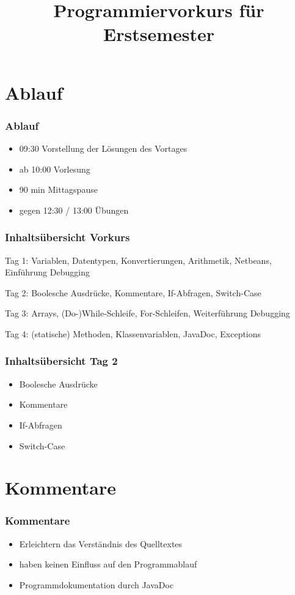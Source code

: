 \documentclass[final]{beamer}
\title{Programmiervorkurs für Erstsemester}
\begin{document}



\begin{frame}
  \titlepage
\end{frame}

\section{Ablauf}
\begin{frame}
  \frametitle{Ablauf}
  \begin{itemize}
    \item{09:30 Vorstellung der Lösungen des Vortages}
    \item{ab 10:00 Vorlesung}
    \item{90 min Mittagspause}
    \item{gegen 12:30 / 13:00 Übungen}
  \end{itemize}
\end{frame}

\begin{frame}
  \frametitle{Inhaltsübersicht Vorkurs}
  \begin{itemize}
  {\color{gray}
    \item {Tag 1: Variablen, Datentypen, Konvertierungen, Arithmetik, Netbeans, Einführung Debugging}
    {\color{black}
    \item {Tag 2: Boolesche Ausdrücke, Kommentare, If-Abfragen, Switch-Case}
    }
    \item {Tag 3: Arrays, (Do-)While-Schleife, For-Schleifen, Weiterführung Debugging}
    \item {Tag 4: (statische) Methoden, Klassenvariablen, JavaDoc, Exceptions}
  }
  \end{itemize}
\end{frame}

\begin{frame}
	\frametitle{Inhaltsübersicht Tag 2}
	\begin{itemize}
		\item {Boolesche Ausdrücke}
		\item {Kommentare}
		\item {If-Abfragen}
		\item {Switch-Case}
	\end{itemize}
\end{frame}

\section{Kommentare}
\begin{frame}
	\frametitle{Kommentare}
	\begin{itemize}
		\item{Erleichtern das Verständnis des Quelltextes}
		\item{haben keinen Einfluss auf den Programmablauf}
		\item{Programmdokumentation durch JavaDoc}
	\end{itemize}
\end{frame}
\end{document}
